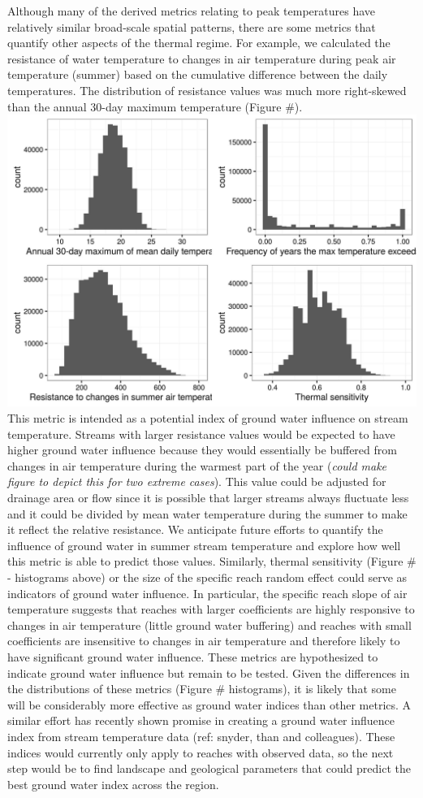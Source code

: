 \documentclass[]{article}
\begin{document}
Although many of the derived metrics relating to peak temperatures have
relatively similar broad-scale spatial patterns, there are some metrics
that quantify other aspects of the thermal regime. For example, we
calculated the resistance of water temperature to changes in air
temperature during peak air temperature (summer) based on the cumulative
difference between the daily temperatures. The distribution of
resistance values was much more right-skewed than the annual 30-day
maximum temperature (Figure
\#).\includegraphics{Figures/metrics_histograms.jpg} This metric is
intended as a potential index of ground water influence on stream
temperature. Streams with larger resistance values would be expected to
have higher ground water influence because they would essentially be
buffered from changes in air temperature during the warmest part of the
year (\emph{could make figure to depict this for two extreme cases}).
This value could be adjusted for drainage area or flow since it is
possible that larger streams always fluctuate less and it could be
divided by mean water temperature during the summer to make it reflect
the relative resistance. We anticipate future efforts to quantify the
influence of ground water in summer stream temperature and explore how
well this metric is able to predict those values. Similarly, thermal
sensitivity (Figure \# - histograms above) or the size of the specific
reach random effect could serve as indicators of ground water influence.
In particular, the specific reach slope of air temperature suggests that
reaches with larger coefficients are highly responsive to changes in air
temperature (little ground water buffering) and reaches with small
coefficients are insensitive to changes in air temperature and therefore
likely to have significant ground water influence. These metrics are
hypothesized to indicate ground water influence but remain to be tested.
Given the differences in the distributions of these metrics (Figure \#
histograms), it is likely that some will be considerably more effective
as ground water indices than other metrics. A similar effort has
recently shown promise in creating a ground water influence index from
stream temperature data (ref: snyder, than and colleagues). These
indices would currently only apply to reaches with observed data, so the
next step would be to find landscape and geological parameters that
could predict the best ground water index across the region.
\end{document}

